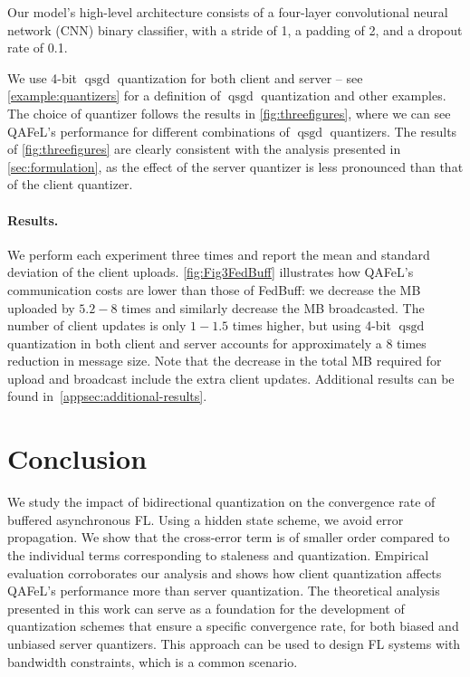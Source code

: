 \documentclass[nohyperref]{article}
\theoremstyle{plain}
\theoremstyle{definition}
\theoremstyle{remark}
\newcommand{\algname}{{QAFeL}\xspace} %
\DeclareMathOperator{\qsgd}{qsgd}
\begin{document}
Our model's high-level architecture consists of a four-layer convolutional neural network (CNN) binary classifier, with a stride of 1, a padding of 2, and a dropout rate of 0.1.

We use 4-bit $\qsgd$ quantization for both client and server -- see \cref{example:quantizers} for a definition of $\qsgd$ quantization and other examples.
The choice of quantizer follows the results in \cref{fig:threefigures}, where we can see \algname's performance for different combinations of $\qsgd$ quantizers.
The results of \cref{fig:threefigures} are clearly consistent with the analysis presented in \cref{sec:formulation}, as the effect of the server quantizer is less pronounced than that of the client quantizer.

\paragraph{Results.}
\label{par:results}
We perform each experiment three times and report the mean and standard deviation of the client uploads.
\cref{fig:Fig3FedBuff} illustrates how \algname's communication costs are lower than those of FedBuff: we decrease the MB uploaded by  $5.2-8$ times and similarly decrease the MB broadcasted.
The number of client updates is only $1-1.5$ times higher, but using 4-bit $\qsgd$ quantization in both client and server accounts for approximately a $8$ times reduction in message size.
Note that the decrease in the total MB required for upload and broadcast include the extra client updates.
Additional results can be found in~\cref{appsec:additional-results}.


\section{Conclusion}
\label{sec:conclusion}
We study the impact of bidirectional quantization on the convergence rate of buffered asynchronous FL.
Using a hidden state scheme, we avoid error propagation.
We show that the cross-error term is of smaller order compared to the individual terms corresponding to staleness and quantization.
Empirical evaluation corroborates our analysis and shows how client quantization affects \algname's performance more than server quantization.
The theoretical analysis presented in this work can serve as a foundation for the development of quantization schemes that ensure a specific convergence rate, for both biased and unbiased server quantizers.
This approach can be used to design FL systems with bandwidth constraints, which is a common scenario.
\newpage


\end{document}
